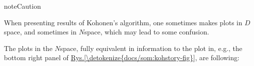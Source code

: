 \documentclass[a4paper,12pt,polish]{jupyterBook}
\begin{document}
\begin{sphinxadmonition}{note}{Caution}

\sphinxAtStartPar
When presenting results of Kohonen’s algorithm, one sometimes makes plots in \(D\)\sphinxhyphen{}space, and sometimes in \(N\)\sphinxhyphen{}space, which may lead to some confusion.
\end{sphinxadmonition}

\sphinxAtStartPar
The plots in the \(N\)\sphinxhyphen{}space, fully equivalent in information to the plot in, e.g., the bottom right panel of \hyperref[\detokenize{docs/som:kohstory-fig}]{Rys.\@ \ref{\detokenize{docs/som:kohstory-fig}}}, are following:
\begin{sphinxVerbatimOutput}

\noindent{}
\end{sphinxVerbatimOutput}
\end{document}

